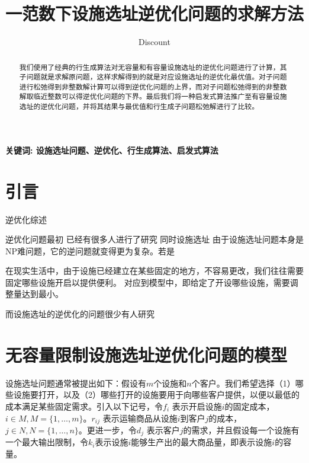 \documentclass[UTF8]{article}
\author {Dis\cdot count}
\title {一范数下设施选址逆优化问题的求解方法}
\date{}
\begin{document}
    \maketitle

\begin{abstract}

我们使用了经典的行生成算法对无容量和有容量设施选址的逆优化问题进行了计算，其子问题就是求解原问题，这样求解得到的就是对应设施选址的逆优化最优值。对子问题进行松弛得到非整数解计算可以得到逆优化问题的上界，而对子问题松弛得到的非整数解取临近整数可以得逆优化问题的下界。最后我们将一种启发式算法推广至有容量设施选址的逆优化问题，并将其结果与最优值和行生成子问题松弛解进行了比较。

\end{abstract}

\qquad \textbf{关键词: 设施选址问题、逆优化、行生成算法、启发式算法}

\section{引言}  %
逆优化综述

逆优化问题最初
已经有很多人进行了研究
同时设施选址
由于设施选址问题本身是NP难问题，它的逆问题就变得更为复杂。若是

在现实生活中，由于设施已经建立在某些固定的地方，不容易更改，我们往往需要固定哪些设施开启以提供便利。
对应到模型中，即给定了开设哪些设施，需要调整量达到最小。

而设施选址的逆优化的问题很少有人研究

\section{无容量限制设施选址逆优化问题的模型}

设施选址问题通常被提出如下：假设有$m$个设施和$n$个客户。我们希望选择（1）哪些设施要打开，以及（2）哪些打开的设施要用于向哪些客户提供，以便以最低的成本满足某些固定需求。引入以下记号，令$f_i$ 表示开启设施$i$的固定成本，$i \in M, M=\{1,\ldots,m\}$。$r_{ij}$ 表示运输商品从设施$i$到客户$j$的成本，$j \in N, N=\{1,\ldots,n\}$。更进一步，令$d_j$ 表示客户$j$的需求，并且假设每一个设施有一个最大输出限制，令$k_i$表示设施$i$能够生产出的最大商品量，即表示设施$i$的容量。
\end{document}
